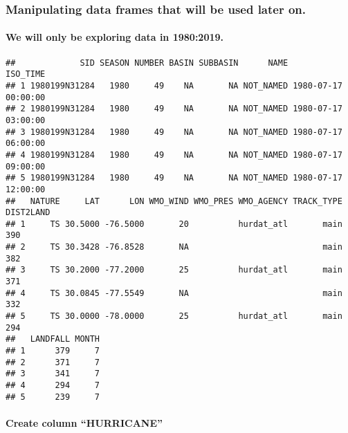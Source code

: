 \documentclass[
]{article}
\newenvironment{Shaded}{\begin{snugshade}}{\end{snugshade}}
\newcommand{\DecValTok}[1]{\textcolor[rgb]{0.00,0.00,0.81}{#1}}
\newcommand{\KeywordTok}[1]{\textcolor[rgb]{0.13,0.29,0.53}{\textbf{#1}}}
\newcommand{\NormalTok}[1]{#1}
\newcommand{\OperatorTok}[1]{\textcolor[rgb]{0.81,0.36,0.00}{\textbf{#1}}}
\newcommand{\StringTok}[1]{\textcolor[rgb]{0.31,0.60,0.02}{#1}}
\begin{document}
\hypertarget{manipulating-data-frames-that-will-be-used-later-on.}{%
\subsubsection{Manipulating data frames that will be used later
on.}\label{manipulating-data-frames-that-will-be-used-later-on.}}

\hypertarget{we-will-only-be-exploring-data-in-19802019.}{%
\paragraph{We will only be exploring data in
1980:2019.}\label{we-will-only-be-exploring-data-in-19802019.}}

\begin{Shaded}
\end{Shaded}

\begin{verbatim}
##             SID SEASON NUMBER BASIN SUBBASIN      NAME            ISO_TIME
## 1 1980199N31284   1980     49    NA       NA NOT_NAMED 1980-07-17 00:00:00
## 2 1980199N31284   1980     49    NA       NA NOT_NAMED 1980-07-17 03:00:00
## 3 1980199N31284   1980     49    NA       NA NOT_NAMED 1980-07-17 06:00:00
## 4 1980199N31284   1980     49    NA       NA NOT_NAMED 1980-07-17 09:00:00
## 5 1980199N31284   1980     49    NA       NA NOT_NAMED 1980-07-17 12:00:00
##   NATURE     LAT      LON WMO_WIND WMO_PRES WMO_AGENCY TRACK_TYPE DIST2LAND
## 1     TS 30.5000 -76.5000       20          hurdat_atl       main       390
## 2     TS 30.3428 -76.8528       NA                           main       382
## 3     TS 30.2000 -77.2000       25          hurdat_atl       main       371
## 4     TS 30.0845 -77.5549       NA                           main       332
## 5     TS 30.0000 -78.0000       25          hurdat_atl       main       294
##   LANDFALL MONTH
## 1      379     7
## 2      371     7
## 3      341     7
## 4      294     7
## 5      239     7
\end{verbatim}

\hypertarget{create-column-hurricane}{%
\paragraph{Create column ``HURRICANE''}\label{create-column-hurricane}}
\end{document}
